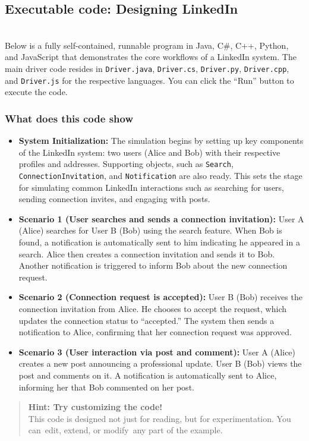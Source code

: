 \subsection{Executable code: Designing LinkedIn}\label{xs-4c2nQg8LDWvadptkwn}
\\
Below is a fully self-contained, runnable program in Java, C\#, C++, Python, and JavaScript that demonstrates the core workflows of a LinkedIn system. The main driver code resides in \texttt{Driver.java}, \texttt{Driver.cs}, \texttt{Driver.py}, \texttt{Driver.cpp}, and \texttt{Driver.js} for the respective languages. You can click the ``Run'' button to execute the code.


\subsubsection{What does this code show}\label{NvONzLe2yVZ6pBBkuXgUF}

\begin{itemize}
\item
\protect{}\label{QNhNF0lWcoHL4LCsans-7}
\textbf{System Initialization:} The simulation begins by setting up key components of the LinkedIn system: two users (Alice and Bob) with their respective profiles and addresses. Supporting objects, such as \texttt{Search}, \texttt{ConnectionInvitation}, and \texttt{Notification} are also ready. This sets the stage for simulating common LinkedIn interactions such as searching for users, sending connection invites, and engaging with posts.
\item
\protect{}\label{Ja9Pb1jptavE7CAZAYazm}
\textbf{Scenario 1 (User searches and sends a connection invitation):} User A (Alice) searches for User B (Bob) using the search feature. When Bob is found, a notification is automatically sent to him indicating he appeared in a search. Alice then creates a connection invitation and sends it to Bob. Another notification is triggered to inform Bob about the new connection request.
\item
\protect{}\label{37Nusdx2j7vxmAjmHorJJ}
\textbf{Scenario 2 (Connection request is accepted):} User B (Bob) receives the connection invitation from Alice. He chooses to accept the request, which updates the connection status to ``accepted.'' The system then sends a notification to Alice, confirming that her connection request was approved.
\item
\protect{}\label{Ta_ogv30GFWYKXifp8kp2}
\textbf{Scenario 3 (User interaction via post and comment):} User A (Alice) creates a new post announcing a professional update. User B (Bob) views the post and comments on it. A notification is automatically sent to Alice, informing her that Bob commented on her post.
\end{itemize}
\begin{quote}
\textbf{Hint: Try customizing the code!}
\\
This code is designed not just for reading, but for experimentation. You can~edit, extend, or modify~any part of the example.
\end{quote}

